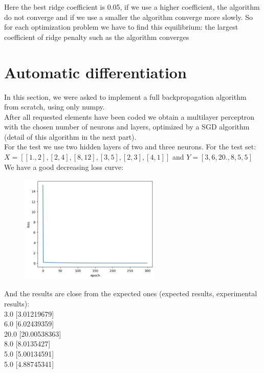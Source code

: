 \documentclass{article}
\begin{document}
    Here the best ridge coefficient is 0.05, if we use a higher coefficient, the algorithm do not converge and if we use a smaller the algorithm converge more slowly. So for each optimization problem we have to find this equilibrium: the largest coefficient of ridge penalty such as the algorithm converges


    
\section{Automatic differentiation}

    In this section, we were asked to implement a full backpropagation algorithm from scratch, using only numpy. \\

    After all requested elements have been coded we obtain a multilayer perceptron with the chosen number of neurons and layers, optimized by a SGD algorithm (detail of this algorithm in the next part). \\

    For the test we use two hidden layers of two and three neurons.
    For the test set: $X=[[1.,2],[2,4],[8,12],[3,5],[2,3],[4,1]]$ and $Y=[3,6,20.,8,5,5]$
    We have a good decreasing loss curve: 

    \begin{figure}[!h]
    \centering
    \includegraphics[width=0.6\textwidth]{images/part2.png}
    \caption{}
    \label{fig:part2}
    \end{figure}   
    
    And the results are close from the expected ones (expected results, experimental results): \\
    3.0 [3.01219679] \\
    6.0 [6.02439359] \\
    20.0 [20.00538363] \\
    8.0 [8.0135427] \\
    5.0 [5.00134591] \\
    5.0 [4.88745341] \\
\end{document}
